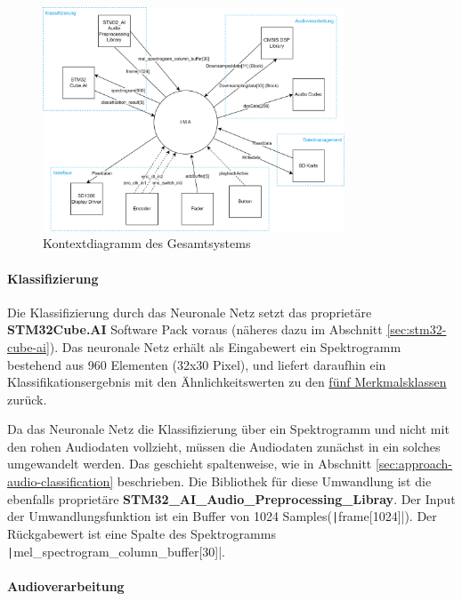 \begin{figure}[H]
   	\centering
   	\includegraphics[width=0.8\textwidth]{images/04_spezifikation/kontextdiagramm_gesamt.drawio.png}
   	\caption{Kontextdiagramm des Gesamtsystems}
   	\label{fig:context_diagram_gesamt}
\end{figure}

\paragraph{Klassifizierung}

Die Klassifizierung durch das Neuronale Netz setzt das proprietäre \textbf{STM32Cube.AI} Software Pack voraus (näheres dazu im Abschnitt \ref{sec:stm32-cube-ai}). Das neuronale Netz erhält als Eingabewert ein Spektrogramm bestehend aus 960 Elementen (32x30 Pixel), und liefert daraufhin ein Klassifikationsergebnis mit den Ähnlichkeitswerten zu den \hyperlink{nn-classes}{fünf Merkmalsklassen} zurück.

Da das Neuronale Netz die Klassifizierung über ein Spektrogramm und nicht mit den rohen Audiodaten vollzieht, müssen die Audiodaten zunächst in ein solches umgewandelt werden. Das geschieht spaltenweise, wie in Abschnitt \ref{sec:approach-audio-classification} beschrieben. Die Bibliothek für diese Umwandlung ist die ebenfalls proprietäre \textbf{STM32\_AI\_Audio\_Preprocessing\_Libray}. Der Input der Umwandlungsfunktion ist ein Buffer von 1024 Samples(\texttt|frame[1024]|). Der Rückgabewert ist eine Spalte des Spektrogramms \newline \texttt|mel_spectrogram_column_buffer[30]|.

\paragraph{Audioverarbeitung}

